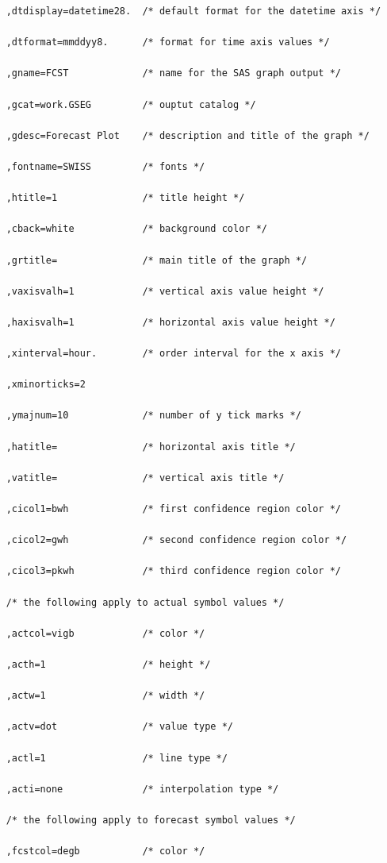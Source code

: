 \documentclass[10pt]{sugconf-ish}
\begin{document}
\begin{verbatim}
    ,dtdisplay=datetime28.  /* default format for the datetime axis */

    ,dtformat=mmddyy8.      /* format for time axis values */

    ,gname=FCST             /* name for the SAS graph output */

    ,gcat=work.GSEG         /* ouptut catalog */

    ,gdesc=Forecast Plot    /* description and title of the graph */

    ,fontname=SWISS         /* fonts */

    ,htitle=1               /* title height */

    ,cback=white            /* background color */

    ,grtitle=               /* main title of the graph */

    ,vaxisvalh=1            /* vertical axis value height */

    ,haxisvalh=1            /* horizontal axis value height */

    ,xinterval=hour.        /* order interval for the x axis */

    ,xminorticks=2

    ,ymajnum=10             /* number of y tick marks */

    ,hatitle=               /* horizontal axis title */

    ,vatitle=               /* vertical axis title */

    ,cicol1=bwh             /* first confidence region color */

    ,cicol2=gwh             /* second confidence region color */

    ,cicol3=pkwh            /* third confidence region color */

    /* the following apply to actual symbol values */        

    ,actcol=vigb            /* color */

    ,acth=1                 /* height */

    ,actw=1                 /* width */

    ,actv=dot               /* value type */

    ,actl=1                 /* line type */

    ,acti=none              /* interpolation type */

    /* the following apply to forecast symbol values */        

    ,fcstcol=degb           /* color */


\end{verbatim}
\end{document}
